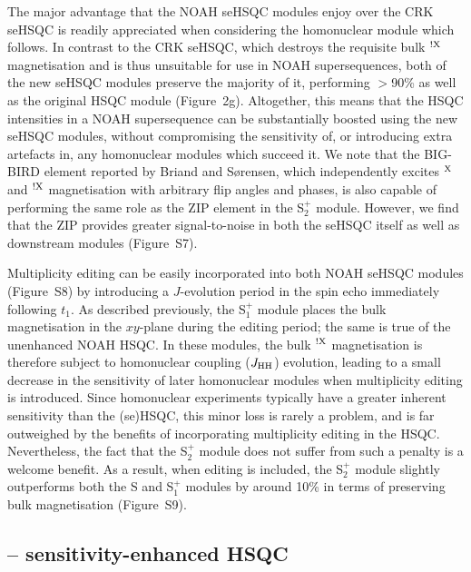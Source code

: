 \documentclass[final,twocolumn]{elsarticle}
\newcommand*{\noahS}{S}
\newcommand*{\noahSpa}{S$^+_1$}
\newcommand*{\noahSpb}{S$^+_2$}
\newcommand*{\proton}{\ce{^{1}H}}
\newcommand*{\nitrogen}{\ce{^{15}N}}
\newcommand*{\jhh}{J_{\ce{HH}}}
\newcommand*{\magn}[1]{\ce{^1H}$^{#1}$}
\newcommand*{\magnnot}[1]{\ce{^1H}$^{!#1}$}
\begin{document}
The major advantage that the NOAH seHSQC modules enjoy over the CRK seHSQC is readily appreciated when considering the homonuclear module which follows.
In contrast to the CRK seHSQC, which destroys the requisite bulk \magnnot{\ce{X}} magnetisation and is thus unsuitable for use in NOAH supersequences, both of the new seHSQC modules preserve the majority of it, performing $>$90\% as well as the original HSQC module (Figure~2g).
Altogether, this means that the HSQC intensities in a NOAH supersequence can be substantially boosted using the new seHSQC modules, without compromising the sensitivity of, or introducing extra artefacts in, any homonuclear modules which succeed it.
We note that the BIG-BIRD element reported by Briand and S{\o}rensen\cite{Briand1997JMR}, which independently excites \magn{\ce{X}} and \magnnot{\ce{X}} magnetisation with arbitrary flip angles and phases, is also capable of performing the same role as the ZIP element in the \noahSpb{} module.
However, we find that the ZIP provides greater signal-to-noise in both the seHSQC itself as well as downstream modules (Figure~S7).

Multiplicity editing\cite{Parella1997JMR} can be easily incorporated into both NOAH seHSQC modules (Figure~S8) by introducing a $J$-evolution period in the spin echo immediately following $t_1$.
As described previously, the \noahSpa{} module places the bulk magnetisation in the $xy$-plane during the editing period; the same is true of the unenhanced NOAH HSQC.
In these modules, the bulk \magnnot{\ce{X}} magnetisation is therefore subject to homonuclear coupling ($\jhh$) evolution, leading to a small decrease in the sensitivity of later homonuclear modules when multiplicity editing is introduced.
Since homonuclear experiments typically have a greater inherent sensitivity than the (se)HSQC, this minor loss is rarely a problem, and is far outweighed by the benefits of incorporating multiplicity editing in the HSQC.
Nevertheless, the fact that the \noahSpb{} module does not suffer from such a penalty is a welcome benefit.
As a result, when editing is included, the \noahSpb{} module slightly outperforms both the \noahS{} and \noahSpa{} modules by around 10\% in terms of preserving bulk magnetisation (Figure~S9).

\subsection{\proton{}--\nitrogen{} sensitivity-enhanced HSQC}
\end{document}
